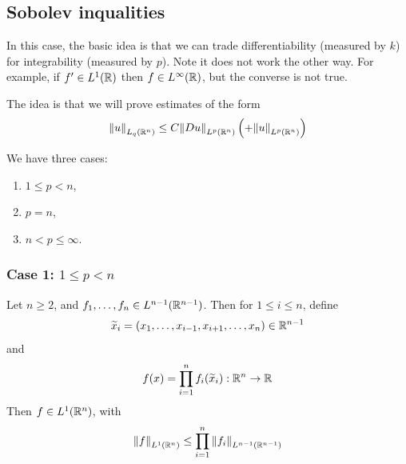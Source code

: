 \documentclass{article}
\begin{document}
\subsection{Sobolev inqualities}

In this case, the basic idea is that we can trade differentiability (measured by \(k\)) for integrability (measured by \(p\)). Note it does not work the other way. For example, if \(f' \in L^1(\mathbb{R})\) then \(f \in L^\infty(\mathbb{R})\), but the converse is not true.

The idea is that we will prove estimates of the form
\[\norm{u}_{L_q(\mathbb{R}^n)} \le C\norm{D u}_{L^p(\mathbb{R}^n)} \left(+ \norm{u}_{L^p(\mathbb{R}^n)}\right)\]

We have three cases:
\begin{enumerate}
    \item \(1 \le p < n\),
    \item \(p = n\),
    \item \(n < p \le \infty\).
\end{enumerate}

\subsubsection*{Case 1: \(1 \le p < n\)}

\begin{lemma}
    Let \(n \ge 2\), and \(f_1, \dots, f_n \in L^{n-1}(\mathbb{R}^{n-1})\). Then for \(1 \le i \le n\), define 
    \[\widetilde x_i = (x_1, \dots, x_{i-1}, x_{i+1}, \dots, x_n) \in \mathbb{R}^{n-1}\]
    and
    \[f(x) = \prod_{i=1}^n f_i(\widetilde x_i) : \mathbb{R}^n \to \mathbb{R}\]
    Then \(f \in L^1(\mathbb{R}^n)\), with
    \[\norm{f}_{L^1(\mathbb{R}^n)} \le \prod_{i=1}^n \norm{f_i}_{L^{n-1}(\mathbb{R}^{n-1})}\]
\end{lemma}
\end{document}
